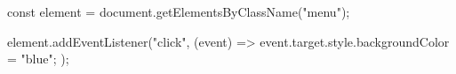 const element = document.getElementsByClassName("menu");

element.addEventListener("click", (event) => {
    event.target.style.backgroundColor = "blue";
});
